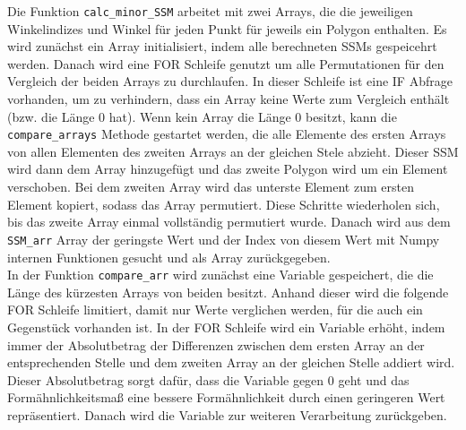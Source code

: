 {	Die Funktion \lstinline|calc_minor_SSM| arbeitet mit zwei Arrays, die die jeweiligen Winkelindizes und Winkel für jeden Punkt für jeweils ein Polygon enthalten. Es wird zunächst ein Array initialisiert, indem alle berechneten SSMs gespeicehrt werden. Danach wird eine FOR Schleife genutzt um alle Permutationen für den Vergleich der beiden Arrays zu durchlaufen. In dieser Schleife ist eine IF Abfrage vorhanden, um zu verhindern, dass ein Array keine Werte zum Vergleich enthält (bzw. die Länge 0 hat). Wenn kein Array die Länge 0 besitzt, kann die \lstinline|compare_arrays| Methode gestartet werden, die alle Elemente des ersten Arrays von allen Elementen des zweiten Arrays an der gleichen Stele abzieht. Dieser SSM wird dann dem Array hinzugefügt und das zweite Polygon wird um ein Element verschoben. Bei dem zweiten Array wird das unterste Element zum ersten Element kopiert, sodass das Array permutiert. Diese Schritte wiederholen sich, bis das zweite Array einmal vollständig permutiert wurde. Danach wird aus dem \lstinline|SSM_arr| Array der geringste Wert und der Index von diesem Wert mit Numpy internen Funktionen gesucht und als Array zurückgegeben. \\

	In der Funktion \lstinline|compare_arr| wird zunächst eine Variable gespeichert, die die Länge des kürzesten Arrays von beiden besitzt. Anhand dieser wird die folgende FOR Schleife limitiert, damit nur Werte verglichen werden, für die auch ein Gegenstück vorhanden ist.
	In der FOR Schleife wird ein Variable erhöht, indem immer der Absolutbetrag der Differenzen zwischen dem ersten Array an der entsprechenden Stelle und dem zweiten Array an der gleichen Stelle addiert wird. Dieser Absolutbetrag sorgt dafür, dass die Variable gegen 0 geht und das Formähnlichkeitsmaß eine bessere Formähnlichkeit durch einen geringeren Wert repräsentiert. Danach wird die Variable zur weiteren Verarbeitung zurückgeben.

	
	


	

	

}
